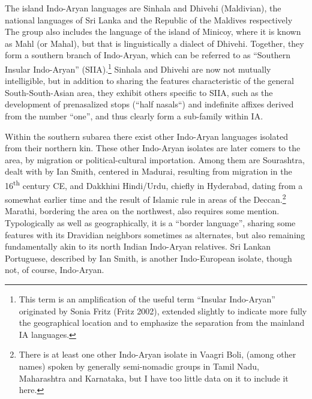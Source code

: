 \documentclass[letterpaper]{article}
\begin{document}
The island Indo-Aryan languages are Sinhala and Dhivehi (Maldivian), the national languages of Sri Lanka and the Republic of the Maldives respectively The group also includes the language of the island of Minicoy, where it is known as Mahl (or Mahal), but that is linguistically a dialect of Dhivehi. Together, they form a southern branch of Indo-Aryan, which can be referred to as ``Southern Insular Indo-Aryan'' (SIIA).\footnote{This
  term is an amplification of the useful term ``Insular Indo-Aryan'' originated by Sonia Fritz (Fritz 2002), extended slightly to indicate more fully the geographical location and to emphasize the separation from the mainland IA languages.
}
Sinhala and Dhivehi are now not mutually intelligible, but in addition to sharing the features characteristic of the general South-South-Asian area, they exhibit others specific to SIIA, such as the development of prenasalized stops (``half nasals``) and indefinite affixes derived from the number ``one'', and thus clearly form a sub-family within IA. 

Within the southern subarea there exist other Indo-Aryan languages isolated from their northern kin. These other Indo-Aryan isolates are later comers to the area, by migration or political-cultural importation. Among them are Sourashtra, dealt with by Ian Smith, centered in Madurai, resulting from migration in the 16\textsuperscript{th} century CE, and Dakkhini Hindi/Urdu, chiefly in Hyderabad, dating from a somewhat earlier time and the result of Islamic rule in areas of the Deccan.\footnote{There
  is at least one other Indo-Aryan isolate in Vaagri Boli, (among other names) spoken by generally semi-nomadic groups in Tamil Nadu, Maharashtra and Karnataka, but I have too little data on it to include it here.
} 
Marathi, bordering the area on the northwest, also requires some mention. Typologically as well as geographically, it is a ``border language'', sharing some features with its Dravidian neighbors sometimes as alternates, but also remaining fundamentally akin to its north Indian Indo-Aryan relatives. Sri Lankan Portuguese, described by Ian Smith, is another Indo-European isolate, though not, of course, Indo-Aryan. 
\end{document}
